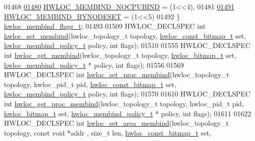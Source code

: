 \begin{DoxyCode}
01468 
\hyperlink{a00191_ggab00475fd98815bf4fb9aaf752030e7d2aad6b9eaf2ee324ca58dc8f58094b9997}{01480}   \hyperlink{a00191_ggab00475fd98815bf4fb9aaf752030e7d2aad6b9eaf2ee324ca58dc8f58094b9997}{HWLOC\_MEMBIND\_NOCPUBIND} =     (1<<4),
01481 
\hyperlink{a00191_ggab00475fd98815bf4fb9aaf752030e7d2a71f19fe4505f1c083dc8e6f7bdea6256}{01491}   \hyperlink{a00191_ggab00475fd98815bf4fb9aaf752030e7d2a71f19fe4505f1c083dc8e6f7bdea6256}{HWLOC\_MEMBIND\_BYNODESET} =     (1<<5)
01492 \} \hyperlink{a00191_gab00475fd98815bf4fb9aaf752030e7d2}{hwloc\_membind\_flags\_t};
01493 
01509 HWLOC\_DECLSPEC \textcolor{keywordtype}{int} \hyperlink{a00191_ga020951efa0ce3862bd4faec295501a7f}{hwloc\_set\_membind}(hwloc\_topology\_t topology, 
      \hyperlink{a00205_gae991a108af01d408be2776c5b2c467b2}{hwloc\_const\_bitmap\_t} \textcolor{keyword}{set}, \hyperlink{a00191_gac9764f79505775d06407b40f5e4661e8}{hwloc\_membind\_policy\_t} policy, \textcolor{keywordtype}{int} 
      flags);
01510 
01555 HWLOC\_DECLSPEC \textcolor{keywordtype}{int} \hyperlink{a00191_gae21f0a1a884929c784bebf070252aa56}{hwloc\_get\_membind}(hwloc\_topology\_t topology, 
      \hyperlink{a00205_gaa3c2bf4c776d603dcebbb61b0c923d84}{hwloc\_bitmap\_t} \textcolor{keyword}{set}, \hyperlink{a00191_gac9764f79505775d06407b40f5e4661e8}{hwloc\_membind\_policy\_t} * policy, \textcolor{keywordtype}{int} flags);
01556 
01569 HWLOC\_DECLSPEC \textcolor{keywordtype}{int} \hyperlink{a00191_gabc91ff16f7e41047924e3a4ae6d9da7e}{hwloc\_set\_proc\_membind}(hwloc\_topology\_t topology, hwloc\_pid\_t pid,
       \hyperlink{a00205_gae991a108af01d408be2776c5b2c467b2}{hwloc\_const\_bitmap\_t} \textcolor{keyword}{set}, \hyperlink{a00191_gac9764f79505775d06407b40f5e4661e8}{hwloc\_membind\_policy\_t} policy, \textcolor{keywordtype}{int} 
      flags);
01570 
01610 HWLOC\_DECLSPEC \textcolor{keywordtype}{int} \hyperlink{a00191_ga1730ceb18ec6ee3b7bd3d0db81f07dc8}{hwloc\_get\_proc\_membind}(hwloc\_topology\_t topology, hwloc\_pid\_t pid,
       \hyperlink{a00205_gaa3c2bf4c776d603dcebbb61b0c923d84}{hwloc\_bitmap\_t} \textcolor{keyword}{set}, \hyperlink{a00191_gac9764f79505775d06407b40f5e4661e8}{hwloc\_membind\_policy\_t} * policy, \textcolor{keywordtype}{int} flags);
01611 
01622 HWLOC\_DECLSPEC \textcolor{keywordtype}{int} \hyperlink{a00191_gaf881faefe20701229f07dd7dbd0125ed}{hwloc\_set\_area\_membind}(hwloc\_topology\_t topology, \textcolor{keyword}{const} \textcolor{keywordtype}{void} *addr
      , \textcolor{keywordtype}{size\_t} len, \hyperlink{a00205_gae991a108af01d408be2776c5b2c467b2}{hwloc\_const\_bitmap\_t} \textcolor{keyword}{set}, 

\end{DoxyCode}
